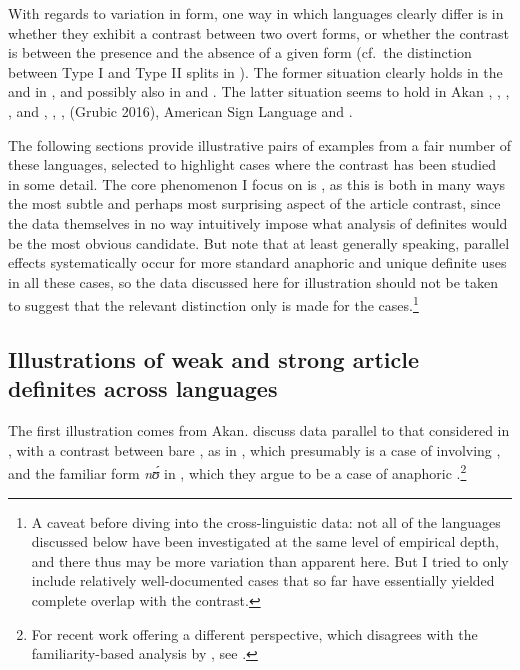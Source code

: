 \documentclass[output=paper
,modfonts
,nonflat]{langscibook}
\begin{document}
With regards to variation in form, one way in which languages clearly
differ is in whether they exhibit a contrast between two overt forms,
or whether the contrast is between the presence and the absence
of a given form (cf.\ the distinction between Type I and Type II splits
in \citealt{Ortmann2014}). The former situation clearly holds in the  and in  \citep{Ingason2016}, and possibly also in
 and  \citep[for discussion and references,
see][]{Schwarz2013}. The latter situation seems to hold
in  Akan \citep{ArkohMatthewson2013},
  \citep{Cho2016,Ahn2016}, 
  \citep{Wespel2008},
  \citep{Simek2016},
  and  \citep{Jenks2015},
  \citep{Ortmann2014},
   \citep{Ortmann2014},
  (Grubic 2016), American Sign Language \citep{IraniSchwarz2016}
and  \citep{Sereikaite2016}. 

The following sections provide illustrative pairs of examples from
a fair number of these languages, selected to highlight cases where the contrast has been studied in some detail.
The core phenomenon I focus on is  , as this is
both in many ways the most subtle and perhaps most surprising aspect
of the article contrast, since the data themselves in no way intuitively
impose what analysis of definites would be the most obvious
candidate. But note that at least generally speaking, parallel
effects systematically occur for more standard anaphoric and unique
  definite uses in all these cases, so the data discussed here for
  illustration should not be
  taken to suggest that the relevant distinction only is made for the
   cases.\footnote{A caveat before diving into the cross-linguistic data: not all
of the languages discussed below have been investigated at the same
level of empirical depth, and there thus may be more variation than
apparent here. But I tried to only include relatively well-documented cases
that so far have essentially yielded complete overlap with the 
contrast.}


\subsection{Illustrations of weak and strong article definites across languages} 

The first illustration comes from Akan. \citet{ArkohMatthewson2013}
discuss data parallel to that considered in \citet{Schwarz2009}, with a contrast between bare , as in ,
which presumably is a case of  involving , and the familiar form \textit{n\'ʊ} in
, which they argue to be a case of anaphoric
.\footnote{For recent work offering a different perspective, which disagrees with
  the familiarity-based analysis by \citet{ArkohMatthewson2013}, see \citet{Bombi-Ferrer2017}.}\newpage
\end{document}
